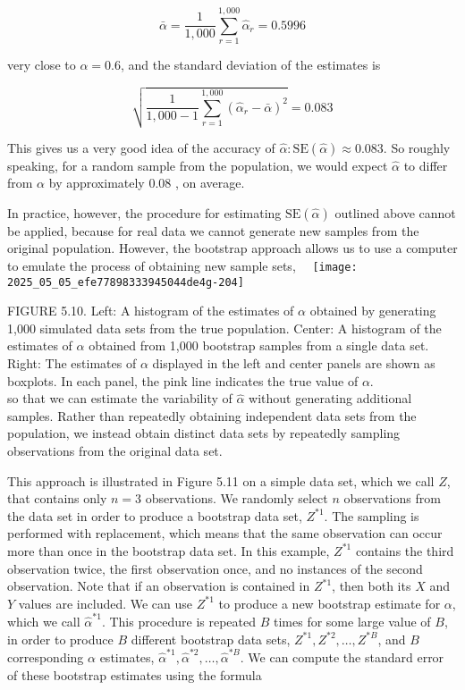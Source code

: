 \documentclass[10pt]{article}
\begin{document}
$$
\bar{\alpha}=\frac{1}{1,000} \sum_{r=1}^{1,000} \hat{\alpha}_{r}=0.5996
$$

very close to $\alpha=0.6$, and the standard deviation of the estimates is

$$
\sqrt{\frac{1}{1,000-1} \sum_{r=1}^{1,000}\left(\hat{\alpha}_{r}-\bar{\alpha}\right)^{2}}=0.083
$$

This gives us a very good idea of the accuracy of $\hat{\alpha}: \mathrm{SE}(\hat{\alpha}) \approx 0.083$. So roughly speaking, for a random sample from the population, we would expect $\hat{\alpha}$ to differ from $\alpha$ by approximately 0.08 , on average.

In practice, however, the procedure for estimating $\mathrm{SE}(\hat{\alpha})$ outlined above cannot be applied, because for real data we cannot generate new samples from the original population. However, the bootstrap approach allows us to use a computer to emulate the process of obtaining new sample sets,\
\
\texttt{[image: 2025\_05\_05\_efe77898333945044de4g-204]}

FIGURE 5.10. Left: A histogram of the estimates of $\alpha$ obtained by generating 1,000 simulated data sets from the true population. Center: A histogram of the estimates of $\alpha$ obtained from 1,000 bootstrap samples from a single data set. Right: The estimates of $\alpha$ displayed in the left and center panels are shown as boxplots. In each panel, the pink line indicates the true value of $\alpha$.\\
so that we can estimate the variability of $\hat{\alpha}$ without generating additional samples. Rather than repeatedly obtaining independent data sets from the population, we instead obtain distinct data sets by repeatedly sampling observations from the original data set.

This approach is illustrated in Figure 5.11 on a simple data set, which we call $Z$, that contains only $n=3$ observations. We randomly select $n$ observations from the data set in order to produce a bootstrap data set, $Z^{* 1}$. The sampling is performed with replacement, which means that the same observation can occur more than once in the bootstrap data set. In this example, $Z^{* 1}$ contains the third observation twice, the first observation once, and no instances of the second observation. Note that if an observation is contained in $Z^{* 1}$, then both its $X$ and $Y$ values are included. We can use $Z^{* 1}$ to produce a new bootstrap estimate for $\alpha$, which we call $\hat{\alpha}^{* 1}$. This procedure is repeated $B$ times for some large value of $B$, in order to produce $B$ different bootstrap data sets, $Z^{* 1}, Z^{* 2}, \ldots, Z^{* B}$, and $B$ corresponding $\alpha$ estimates, $\hat{\alpha}^{* 1}, \hat{\alpha}^{* 2}, \ldots, \hat{\alpha}^{* B}$. We can compute the standard error of these bootstrap estimates using the formula
\end{document}
